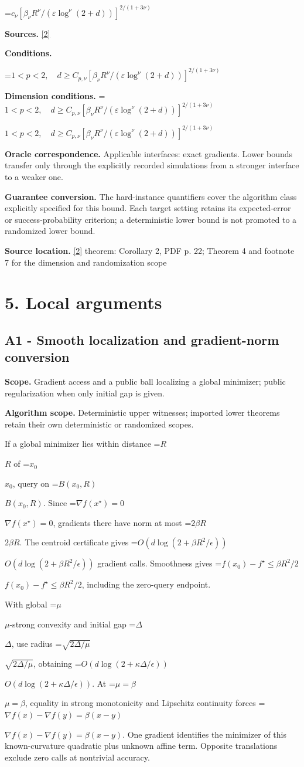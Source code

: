 \documentclass[10pt,a4paper]{article}
\newcommand{\AtlasMath}[1]{\par\begingroup\centering\setbox0=\hbox{$\displaystyle #1$}\ifdim\wd0>1.4\linewidth\typeout{ATLAS WIDE FORMULA: \the\wd0}\fi\ifdim\wd0>\linewidth\resizebox{\linewidth}{!}{\box0}\else\box0\fi\par\endgroup}
\newcommand{\AtlasInlineMath}[1]{\begingroup\setbox0=\hbox{$#1$}\ifdim\wd0>.4\linewidth\endgroup\AtlasMath{#1}\else\endgroup$#1$\fi}
\begin{document}
\AtlasMath{c_\nu[\beta_\nu R^\nu/(\varepsilon\log^\nu(2+d))]^{2/(1+3\nu)}}
\textbf{Sources.} \href{https://arxiv.org/pdf/2101.11041v2}{[2]}

\textbf{Conditions.} 
\AtlasMath{1<p<2,\quad d\ge C_{p,\nu}[\beta_\nu R^\nu/(\varepsilon\log^\nu(2+d))]^{2/(1+3\nu)}}


\textbf{Dimension conditions.} \AtlasInlineMath{1<p<2,\quad d\ge C_{p,\nu}[\beta_\nu R^\nu/(\varepsilon\log^\nu(2+d))]^{2/(1+3\nu)}}

\textbf{Oracle correspondence.} Applicable interfaces: exact gradients. Lower bounds transfer only through the explicitly recorded simulations from a stronger interface to a weaker one.

\textbf{Guarantee conversion.} The hard-instance quantifiers cover the algorithm class explicitly specified for this bound. Each target setting retains its expected-error or success-probability criterion; a deterministic lower bound is not promoted to a randomized lower bound.

\textbf{Source location.} \href{https://arxiv.org/pdf/2101.11041v2}{[2]} theorem: Corollary 2, PDF p. 22; Theorem 4 and footnote 7 for the dimension and randomization scope

\section{5. Local arguments}
\subsection{A1 - Smooth localization and gradient-norm conversion}
\textbf{Scope.} Gradient access and a public ball localizing a global minimizer; public regularization when only initial gap is given.

\textbf{Algorithm scope.} Deterministic upper witnesses; imported lower theorems retain their own deterministic or randomized scopes.

If a global minimizer lies within distance \AtlasInlineMath{R} of \AtlasInlineMath{x_0}, query on \AtlasInlineMath{B(x_0,R)}. Since \AtlasInlineMath{\nabla f(x^\star)=0}, gradients there have norm at most \AtlasInlineMath{2\beta R}. The centroid certificate gives \AtlasInlineMath{O(d\log(2+\beta R^2/\epsilon))} gradient calls. Smoothness gives \AtlasInlineMath{f(x_0)-f^\star\le\beta R^2/2}, including the zero-query endpoint.

With global \AtlasInlineMath{\mu}-strong convexity and initial gap \AtlasInlineMath{\Delta}, use radius \AtlasInlineMath{\sqrt{2\Delta/\mu}}, obtaining \AtlasInlineMath{O(d\log(2+\kappa\Delta/\epsilon))}. At \AtlasInlineMath{\mu=\beta}, equality in strong monotonicity and Lipschitz continuity forces \AtlasInlineMath{\nabla f(x)-\nabla f(y)=\beta(x-y)}. One gradient identifies the minimizer of this known-curvature quadratic plus unknown affine term. Opposite translations exclude zero calls at nontrivial accuracy.
\end{document}
